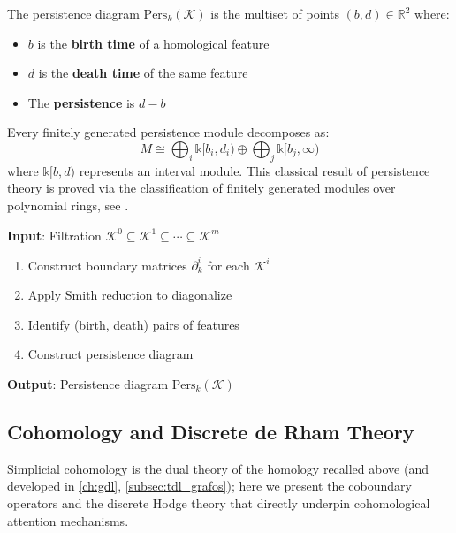 \begin{definition}\label{def:diagrama_persistencia}
The persistence diagram $\text{Pers}_k(\mathcal{K})$ is the multiset of points $(b,d) \in \mathbb{R}^2$ where:
\begin{itemize}
    \item $b$ is the \textbf{birth time} of a homological feature
    \item $d$ is the \textbf{death time} of the same feature
    \item The \textbf{persistence} is $d - b$
\end{itemize}
\end{definition}

\begin{theorem}\label{thm:descomposicion_modulos}
Every finitely generated persistence module decomposes as:
\begin{equation}
    M \cong \bigoplus_i \mathbb{k}[b_i, d_i) \oplus \bigoplus_j \mathbb{k}[b_j, \infty)
\end{equation}
where $\mathbb{k}[b,d)$ represents an interval module. This classical result of persistence theory is proved via the classification of finitely generated modules over polynomial rings, see \citep{Hatcher2002}.
\end{theorem}

\begin{algorithm}[H]
\caption{Persistent Homology Algorithm}\label{alg:homologia_persistente}
\textbf{Input}: Filtration $\mathcal{K}^0 \subseteq \mathcal{K}^1 \subseteq \cdots \subseteq \mathcal{K}^m$
\begin{enumerate}
    \item Construct boundary matrices $\partial_k^i$ for each $\mathcal{K}^i$
    \item Apply Smith reduction to diagonalize
    \item Identify (birth, death) pairs of features
    \item Construct persistence diagram
\end{enumerate}
\textbf{Output}: Persistence diagram $\text{Pers}_k(\mathcal{K})$
\end{algorithm}

\subsection{Cohomology and Discrete de Rham Theory}

Simplicial cohomology is the dual theory of the homology recalled above (and developed in \autoref{ch:gdl}, \autoref{subsec:tdl_grafos}); here we present the coboundary operators and the discrete Hodge theory that directly underpin cohomological attention mechanisms.

